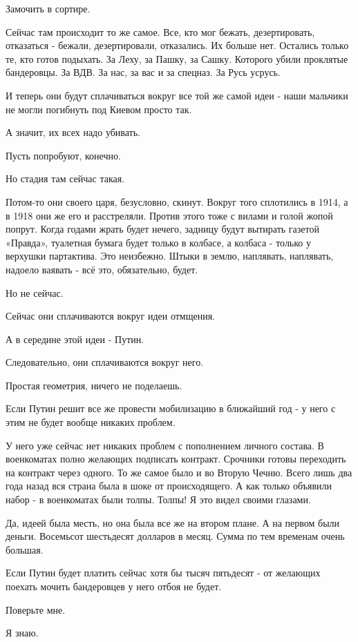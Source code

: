 Замочить в сортире. 

Сейчас там происходит то же самое. Все, кто мог бежать, дезертировать,
отказаться - бежали, дезертировали, отказались. Их больше нет. Остались только
те, кто готов подыхать. За Леху, за Пашку, за Сашку. Которого убили проклятые
бандеровцы. За ВДВ. За нас, за вас и за спецназ. За Русь усрусь.

И теперь они будут сплачиваться вокруг все той же самой идеи - наши мальчики не
могли погибнуть под Киевом просто так. 

А значит, их всех надо убивать. 

Пусть попробуют, конечно. 

Но стадия там сейчас такая. 

Потом-то они своего царя, безусловно, скинут. Вокруг того сплотились в 1914, а
в 1918 они же его и расстреляли. Против этого тоже с вилами и голой жопой
попрут. Когда годами жрать будет нечего, задницу будут вытирать газетой
«Правда», туалетная бумага будет только в колбасе, а колбаса - только у
верхушки партактива. Это неизбежно. Штыки в землю, наплявать, наплявать,
надоело ваявать - всё это, обязательно, будет. 

Но не сейчас. 

Сейчас они сплачиваются вокруг идеи отмщения.

А в середине этой идеи - Путин. 

Следовательно, они сплачиваются вокруг него. 

Простая геометрия, ничего не поделаешь.

Если Путин решит все же провести мобилизацию в ближайший год - у него с этим не
будет вообще никаких проблем. 

У него уже сейчас нет никаких проблем с пополнением личного состава. В
военкоматах полно желающих подписать контракт. Срочники готовы переходить на
контракт через одного. То же самое было и во Вторую Чечню. Всего лишь два года
назад вся страна была в шоке от происходящего. А как только объявили набор - в
военкоматах были толпы. Толпы! Я это видел своими глазами. 

Да, идеей была месть, но она была все же на втором плане. А на первом были
деньги. Восемьсот шестьдесят долларов в месяц. Сумма по тем временам очень
большая. 

Если Путин будет платить сейчас хотя бы тысяч пятьдесят - от желающих поехать
мочить бандеровцев у него отбоя не будет. 

Поверьте мне. 

Я знаю.

